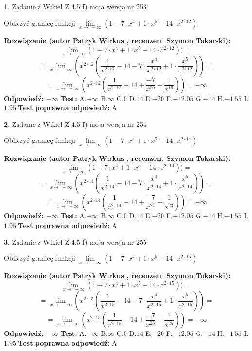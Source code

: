 \documentclass[12pt, a4paper]{article}
\theoremstyle{definition} %
\newtheorem{zad}{}
\newcommand{\zadStart}[1]{\begin{zad}#1\newline}
\newcommand{\zadStop}{\end{zad}}
\newcommand{\rozwStart}[2]{\noindent \textbf{Rozwiązanie (autor #1 , recenzent #2): }\newline}
\newcommand{\rozwStop}{\newline}
\newcommand{\odpStart}{\noindent \textbf{Odpowiedź:}\newline}
\newcommand{\odpStop}{\newline}
\newcommand{\testStart}{\noindent \textbf{Test:}\newline}
\newcommand{\testStop}{\newline}
\newcommand{\kluczStart}{\noindent \textbf{Test poprawna odpowiedź:}\newline}
\newcommand{\kluczStop}{\newline}
\begin{document}
\zadStart{Zadanie z Wikieł Z 4.5 f) moja wersja nr 253}


Obliczyć granicę funkcji  $\lim\limits_{x\to\ -\infty}(1 - 7 \cdot x^{4}+1 \cdot x^{5}- 14 \cdot x^{2\cdot12})$.
\zadStop
\rozwStart{Patryk Wirkus}{Szymon Tokarski}
$$\lim\limits_{x\to\ -\infty}(1 - 7 \cdot x^{4}+1 \cdot x^{5}- 14 \cdot x^{2\cdot12}))=$$
$$=\lim\limits_{x\to\ -\infty}(x^{2\cdot12}(\frac{1}{x^{2\cdot12}}-14 -7 \cdot \frac{x^{4}}{x^{2\cdot12}}+1 \cdot \frac{x^{5}}{x^{2\cdot12}}))=$$
$$=\lim\limits_{x\to\ -\infty}(x^{2\cdot12}(\frac{1}{x^{2\cdot12}}-14 + \frac{-7}{x^{20}}+ \frac{1}{x^{19}}))=-\infty$$
\rozwStop
\odpStart
$-\infty$
\odpStop
\testStart
A.$-\infty$ B.$\infty$ C.$0$ D.$14$ E.$-20$
F.$-12.05$ G.$-14$
H.$-1.55$
I.$1.95$
\testStop
\kluczStart
A
\kluczStop



\zadStart{Zadanie z Wikieł Z 4.5 f) moja wersja nr 254}


Obliczyć granicę funkcji  $\lim\limits_{x\to\ -\infty}(1 - 7 \cdot x^{4}+1 \cdot x^{5}- 14 \cdot x^{2\cdot14})$.
\zadStop
\rozwStart{Patryk Wirkus}{Szymon Tokarski}
$$\lim\limits_{x\to\ -\infty}(1 - 7 \cdot x^{4}+1 \cdot x^{5}- 14 \cdot x^{2\cdot14}))=$$
$$=\lim\limits_{x\to\ -\infty}(x^{2\cdot14}(\frac{1}{x^{2\cdot14}}-14 -7 \cdot \frac{x^{4}}{x^{2\cdot14}}+1 \cdot \frac{x^{5}}{x^{2\cdot14}}))=$$
$$=\lim\limits_{x\to\ -\infty}(x^{2\cdot14}(\frac{1}{x^{2\cdot14}}-14 + \frac{-7}{x^{24}}+ \frac{1}{x^{23}}))=-\infty$$
\rozwStop
\odpStart
$-\infty$
\odpStop
\testStart
A.$-\infty$ B.$\infty$ C.$0$ D.$14$ E.$-20$
F.$-12.05$ G.$-14$
H.$-1.55$
I.$1.95$
\testStop
\kluczStart
A
\kluczStop



\zadStart{Zadanie z Wikieł Z 4.5 f) moja wersja nr 255}


Obliczyć granicę funkcji  $\lim\limits_{x\to\ -\infty}(1 - 7 \cdot x^{4}+1 \cdot x^{5}- 14 \cdot x^{2\cdot15})$.
\zadStop
\rozwStart{Patryk Wirkus}{Szymon Tokarski}
$$\lim\limits_{x\to\ -\infty}(1 - 7 \cdot x^{4}+1 \cdot x^{5}- 14 \cdot x^{2\cdot15}))=$$
$$=\lim\limits_{x\to\ -\infty}(x^{2\cdot15}(\frac{1}{x^{2\cdot15}}-14 -7 \cdot \frac{x^{4}}{x^{2\cdot15}}+1 \cdot \frac{x^{5}}{x^{2\cdot15}}))=$$
$$=\lim\limits_{x\to\ -\infty}(x^{2\cdot15}(\frac{1}{x^{2\cdot15}}-14 + \frac{-7}{x^{26}}+ \frac{1}{x^{25}}))=-\infty$$
\rozwStop
\odpStart
$-\infty$
\odpStop
\testStart
A.$-\infty$ B.$\infty$ C.$0$ D.$14$ E.$-20$
F.$-12.05$ G.$-14$
H.$-1.55$
I.$1.95$
\testStop
\kluczStart
A
\kluczStop
\end{document}
